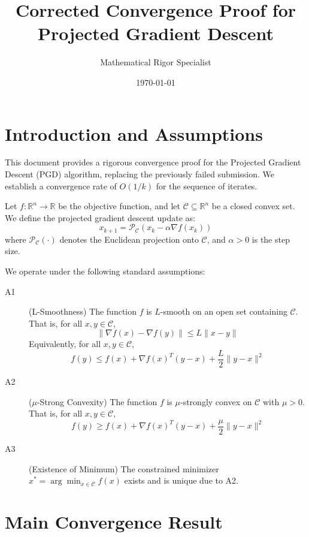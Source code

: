 \documentclass[11pt]{article}
\begin{document}
\title{Corrected Convergence Proof for Projected Gradient Descent}
\author{Mathematical Rigor Specialist}
\date{\today}
\maketitle

\section{Introduction and Assumptions}

This document provides a rigorous convergence proof for the Projected Gradient Descent (PGD) algorithm, replacing the previously failed submission. We establish a convergence rate of $O(1/k)$ for the sequence of iterates. 

Let $f: \mathbb{R}^n \to \mathbb{R}$ be the objective function, and let $\mathcal{C} \subseteq \mathbb{R}^n$ be a closed convex set. We define the projected gradient descent update as:
\begin{equation}
x_{k+1} = \mathcal{P}_{\mathcal{C}}(x_k - \alpha \nabla f(x_k))
\end{equation}
where $\mathcal{P}_{\mathcal{C}}(\cdot)$ denotes the Euclidean projection onto $\mathcal{C}$, and $\alpha > 0$ is the step size.

We operate under the following standard assumptions:

\begin{description}
    \item[A1] (L-Smoothness) The function $f$ is $L$-smooth on an open set containing $\mathcal{C}$. That is, for all $x, y \in \mathcal{C}$,
    \[ \|\nabla f(x) - \nabla f(y)\| \leq L \|x - y\| \]
    Equivalently, for all $x, y \in \mathcal{C}$,
    \[ f(y) \leq f(x) + \nabla f(x)^T (y - x) + \frac{L}{2} \|y - x\|^2 \]
    
    \item[A2] ($\mu$-Strong Convexity) The function $f$ is $\mu$-strongly convex on $\mathcal{C}$ with $\mu > 0$. That is, for all $x, y \in \mathcal{C}$,
    \[ f(y) \geq f(x) + \nabla f(x)^T (y - x) + \frac{\mu}{2} \|y - x\|^2 \]
    
    \item[A3] (Existence of Minimum) The constrained minimizer $x^* = \arg\min_{x \in \mathcal{C}} f(x)$ exists and is unique due to A2.
\end{description}

\section{Main Convergence Result}
\end{document}
